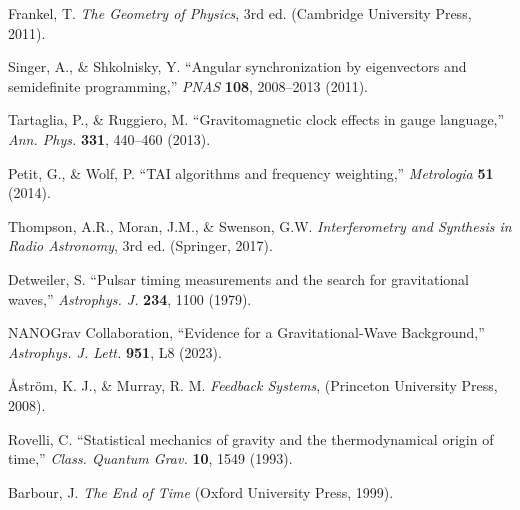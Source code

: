 \documentclass[11pt,a4paper]{article}
\begin{document}

\begin{thebibliography}{99}
Frankel, T. \textit{The Geometry of Physics}, 3rd ed. (Cambridge University Press, 2011).

Singer, A., \& Shkolnisky, Y. ``Angular synchronization by eigenvectors and semidefinite programming,'' \textit{PNAS} \textbf{108}, 2008–2013 (2011).

Tartaglia, P., \& Ruggiero, M. ``Gravitomagnetic clock effects in gauge language,'' \textit{Ann. Phys.} \textbf{331}, 440–460 (2013).

Petit, G., \& Wolf, P. ``TAI algorithms and frequency weighting,'' \textit{Metrologia} \textbf{51} (2014).

Thompson, A.R., Moran, J.M., \& Swenson, G.W. \textit{Interferometry and Synthesis in Radio Astronomy}, 3rd ed. (Springer, 2017).

Detweiler, S. ``Pulsar timing measurements and the search for gravitational waves,'' \textit{Astrophys. J.} \textbf{234}, 1100 (1979).

NANOGrav Collaboration, ``Evidence for a Gravitational-Wave Background,'' \textit{Astrophys. J. Lett.} \textbf{951}, L8 (2023).

Åström, K. J., \& Murray, R. M. \textit{Feedback Systems}, (Princeton University Press, 2008).

Rovelli, C. ``Statistical mechanics of gravity and the thermodynamical origin of time,'' \textit{Class. Quantum Grav.} \textbf{10}, 1549 (1993).

Barbour, J. \textit{The End of Time} (Oxford University Press, 1999).
\end{thebibliography}
\end{document}
